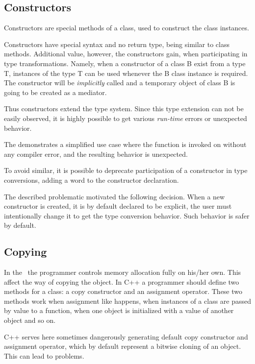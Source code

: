 \subsection{Constructors}
\label{classconstructors}

Constructors are special methods of a class, used to construct the class instances. 

Constructors have special syntax and no return type, being similar to class methods. Additional 
value, however, the constructors gain, when participating in type transformations. Namely, when
a constructor of a class B exist from a type T, instances of the type T can be used whenever
the B class instance is required. The constructor will be \emph{implicitly} called and a temporary object
of class B is going to be created as a mediator. 

Thus constructors extend the type system. Since this type extension can not be easily observed, it is 
highly possible to get various \emph{run-time} errors or unexpected behavior. 


The  demonstrates a simplified use case where the function  is invoked on  without 
any compiler error, and the resulting behavior is unexpected.

To avoid similar, it is possible to deprecate participation of a constructor in type conversions, adding a word  to the constructor
declaration.

The described problematic motivated the following decision. When a new constructor is created, it is by default declared to be explicit,
the user must intentionally change it to get the type conversion behavior. Such behavior is safer by default.

\subsection{Copying}
\label{classcopying}

In the \cpppl\ the programmer controls memory allocation fully on his/her own. This affect the way of copying the object.
In C++ a programmer should define two methods for a class: a copy constructor and an assignment operator.
These two methods work when assignment like  happens, when instances of a class are passed by value to a function, 
when one object is initialized with a value of another object and so on.

C++ serves here sometimes dangerously generating default copy constructor and assignment operator, which by default represent
a bitwise cloning of an object. This can lead to problems.

